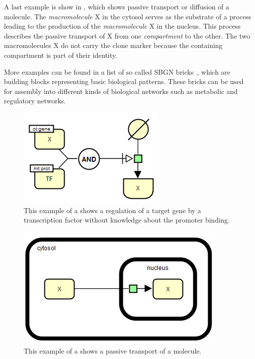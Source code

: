 A last example is show in , which shows passive transport or diffusion of a molecule. The \emph{macromolecule} X in the cytosol serves as the substrate of a process leading to the production of the \emph{macromolecule} X in the nucleus. This process describes the passive transport of X from one \emph{compartment} to the other. The two macromolecules X do not carry the clone marker because the containing compartment is part of their identity.

More examples can be found in a list of so called SBGN bricks~\cite{Junker:2012}, which are building blocks representing basic biological patterns. These bricks can be used for assembly into different kinds of biological networks such as metabolic and regulatory networks.

\begin{figure}[htb]
  \centering
  \vspace*{-0.75em}
  \includegraphics[scale=0.5]{images/Fig14}
  \caption{This example of a \PD shows a regulation of a target gene by a transcription factor without knowledge about the promoter binding.}
  \label{fig:eg4}
\end{figure}


\begin{figure}[htb]
  \centering
  \vspace*{-0.75em}
  \includegraphics[scale=0.5]{images/Fig15}
  \caption{This example of a \PD shows a passive transport of a molecule.}
  \label{fig:eg5}
\end{figure}

